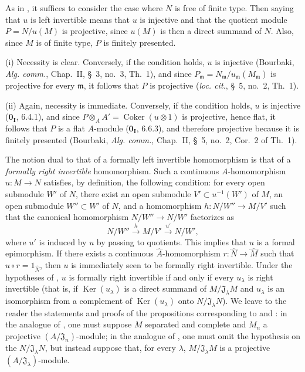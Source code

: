 As in , it suffices to consider the case where $N$ is free of finite type.
Then saying that $u$ is left invertible means that $u$ is injective and that the quotient module $P=N/u(M)$ is projective, since $u(M)$ is then a direct summand of $N$.
Also, since $M$ is of finite type, $P$ is finitely presented.

(i) Necessity is clear.
Conversely, if the condition holds, $u$ is injective (Bourbaki, \emph{Alg. comm.}, Chap.~II, \S~3, no.~3, Th.~1), and since
$P_{\mathfrak m}=N_{\mathfrak m}/u_{\mathfrak m}(M_{\mathfrak m})$ is projective for every $\mathfrak m$, it follows that $P$ is projective (\emph{loc. cit.}, \S~5, no.~2, Th.~1).

(ii) Again, necessity is immediate.
Conversely, if the condition holds, $u$ is injective ($\mathbf{0_I}$, 6.4.1), and since
$P\otimes_AA'=\operatorname{Coker}(u\otimes1)$ is projective, hence flat, it follows that $P$ is a flat $A$-module ($\mathbf{0_I}$, 6.6.3), and therefore projective because it is finitely presented (Bourbaki, \emph{Alg. comm.}, Chap.~II, \S~5, no.~2, Cor.~2 of Th.~1).


\begin{remark}[19.1.15]
\label{0.19.1.15}
The notion dual to that of a formally left invertible homomorphism is that of a \emph{formally right invertible} homomorphism.
Such a continuous $A$-homomorphism $u:M\to N$ satisfies, by definition, the following condition:
for every open submodule $W'$ of $N$, there exist an open submodule $V'\subset u^{-1}(W')$ of $M$, an open submodule $W''\subset W'$ of $N$, and a homomorphism $h:N/W''\to M/V'$ such that the canonical homomorphism $N/W''\to N/W'$ factorizes as
\[
  N/W''\xrightarrow{h}M/V'\xrightarrow{u'}N/W',
\]
where $u'$ is induced by $u$ by passing to quotients.
This implies that $u$ is a formal epimorphism.
If there exists a continuous $\widehat A$-homomorphism $r:\widehat N\to\widehat M$ such that $\widehat u\circ r=1_{\widehat N}$, then $u$ is immediately seen to be formally right invertible.
Under the hypotheses of , $u$ is formally right invertible if and only if every $u_\lambda$ is right invertible (that is, if $\operatorname{Ker}(u_\lambda)$ is a direct summand of $M/\mathfrak J_\lambda M$ and $u_\lambda$ is an isomorphism from a complement of $\operatorname{Ker}(u_\lambda)$ onto $N/\mathfrak J_\lambda N$).
We leave to the reader the statements and proofs of the propositions corresponding to  and :
in the analogue of , one must suppose $M$ separated and complete and $M_n$ a projective $(A/\mathfrak J_n)$-module;
in the analogue of , one must omit the hypothesis on the $N/\mathfrak J_\lambda N$, but instead suppose that, for every $\lambda$, $M/\mathfrak J_\lambda M$ is a projective $(A/\mathfrak J_\lambda)$-module.
\end{remark}

